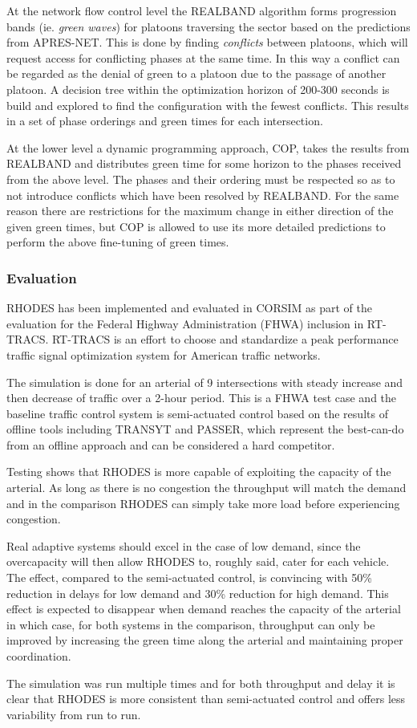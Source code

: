 At the network flow control level the REALBAND algorithm forms
progression bands (ie. \textit{green waves}) for platoons traversing
the sector based on the predictions from APRES-NET. This is done by
finding \textit{conflicts} between platoons, which will request access
for conflicting phases at the same time. In this way a conflict can be
regarded as the denial of green to a platoon due to the passage of
another platoon. A decision tree within the optimization horizon of
200-300 seconds is build and explored to find the configuration with
the fewest conflicts. This results in a set of phase orderings and
green times for each intersection.

At the lower level a dynamic programming approach, COP, takes the
results from REALBAND and distributes green time for some horizon to
the phases received from the above level. The phases and their
ordering must be respected so as to not introduce conflicts which
have been resolved by REALBAND. For the same reason there are
restrictions for the maximum change in either direction of the given
green times, but COP is allowed to use its more detailed predictions
to perform the above fine-tuning of green times.

\subsubsection*{Evaluation}
RHODES has been implemented and evaluated in CORSIM as part of the
evaluation for the Federal Highway Administration (FHWA) inclusion in
RT-TRACS. RT-TRACS is an effort to choose and standardize a peak
performance traffic signal optimization system for American traffic
networks.

The simulation is done for an arterial of 9 intersections with steady
increase and then decrease of traffic over a 2-hour period. This is a
FHWA test case and the baseline traffic control system is
semi-actuated control based on the results of offline tools including
TRANSYT and PASSER, which represent the best-can-do from an offline
approach and can be considered a hard competitor.

Testing shows that RHODES is more capable of exploiting the capacity
of the arterial. As long as there is no congestion the throughput will
match the demand and in the comparison RHODES can simply take more
load before experiencing congestion.

Real adaptive systems should excel in the case of low demand, since
the overcapacity will then allow RHODES to, roughly said, cater for
each vehicle. The effect, compared to the semi-actuated control, is
convincing with 50\% reduction in delays for low demand and 30\%
reduction for high demand. This effect is expected to disappear when
demand reaches the capacity of the arterial in which case, for both
systems in the comparison, throughput can only be improved by
increasing the green time along the arterial and maintaining proper
coordination.

The simulation was run multiple times and for both throughput and
delay it is clear that RHODES is more consistent than semi-actuated
control and offers less variability from run to run.
